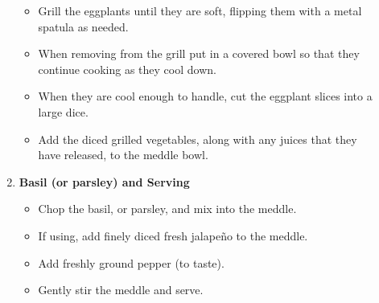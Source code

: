 \documentclass [11pt, letterpaper] {article}
\begin{document}
\begin{description}
\begin{enumerate}
\begin{itemize}
		\item Grill the eggplants until they are soft, flipping them with a metal spatula as needed. 
		\item When removing from the grill put in a covered bowl so that they continue cooking as they cool down.
		\item When they are cool enough to handle, cut the eggplant slices into a large dice.
		\item Add the diced grilled vegetables, along with any juices that they have released, to the meddle bowl.
	\end{itemize}
	\item{\bf Basil (or parsley) and Serving}
	\begin{itemize}	
		\item Chop the basil, or parsley, and mix into the meddle.
		\item If using, add finely diced fresh jalape\~no to the meddle.
		\item Add freshly ground pepper (to taste).
		\item Gently stir the meddle and serve.
	\end{itemize}	
     	\end{enumerate}         
\end{description}
\end{document}
